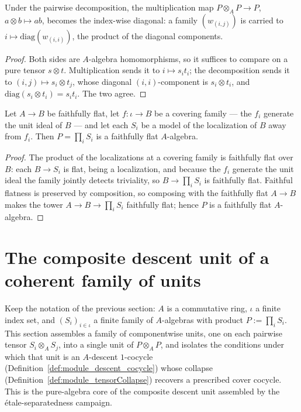 \begin{lemma}
  \label{lem:lmul_transport}
  \leanok
  Under the pairwise decomposition, the multiplication map \(P \otimes_A P \to P\),
  \(a \otimes b \mapsto ab\), becomes the index-wise diagonal: a family \((w_{(i,j)})\) is
  carried to \(i \mapsto \mathrm{diag}(w_{(i,i)})\), the product of the diagonal components.
\end{lemma}
\begin{proof}
  \leanok
  Both sides are \(A\)-algebra homomorphisms, so it suffices to compare on a pure tensor
  \(s \otimes t\). Multiplication sends it to \(i \mapsto s_i t_i\); the decomposition sends it
  to \((i,j) \mapsto s_i \otimes t_j\), whose diagonal \((i,i)\)-component is \(s_i \otimes t_i\),
  and \(\mathrm{diag}(s_i \otimes t_i) = s_i t_i\). The two agree.
\end{proof}

\begin{theorem}
  \label{thm:pi_tower}
  \leanok
  Let \(A \to B\) be faithfully flat, let \(f \colon \iota \to B\) be a covering family — the
  \(f_i\) generate the unit ideal of \(B\) — and let each \(S_i\) be a model of the localization
  of \(B\) away from \(f_i\). Then \(P = \prod_i S_i\) is a faithfully flat \(A\)-algebra.
\end{theorem}
\begin{proof}
  \leanok
  The product of the localizations at a covering family is faithfully flat over \(B\): each
  \(B \to S_i\) is flat, being a localization, and because the \(f_i\) generate the unit ideal
  the family jointly detects triviality, so \(B \to \prod_i S_i\) is faithfully flat. Faithful
  flatness is preserved by composition, so composing with the faithfully flat \(A \to B\) makes
  the tower \(A \to B \to \prod_i S_i\) faithfully flat; hence \(P\) is a faithfully flat
  \(A\)-algebra.
\end{proof}

\section{The composite descent unit of a coherent family of units}
\label{sec:piAssembly}

Keep the notation of the previous section: \(A\) is a commutative ring, \(\iota\) a finite
index set, and \((S_i)_{i \in \iota}\) a finite family of \(A\)-algebras with product
\(P := \prod_i S_i\). This section assembles a family of componentwise units, one on each
pairwise tensor \(S_i \otimes_A S_j\), into a single unit of \(P \otimes_A P\), and isolates
the conditions under which that unit is an \(A\)-descent \(1\)-cocycle
(Definition~\ref{def:module_descent_cocycle}) whose collapse
(Definition~\ref{def:module_tensorCollapse}) recovers a prescribed cover cocycle. This is
the pure-algebra core of the composite descent unit assembled by the \'etale-separatedness
campaign.

